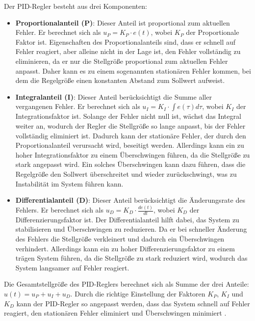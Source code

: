 Der PID-Regler besteht aus drei Komponenten: 
\begin{itemize}
    \item \textbf{Proportionalanteil (P)}: Dieser Anteil ist proportional zum aktuellen Fehler. Er berechnet sich als $ u_P = K_P \cdot e(t)$, wobei $K_P$ der Proportionale Faktor ist. Eigenschaften des Proportionalanteils sind, dass er schnell auf Fehler reagiert, aber alleine nicht in der Lage ist, den Fehler vollständig zu eliminieren, da er nur die Stellgröße proportional zum aktuellen Fehler anpasst. Daher kann es zu einem sogenannten stationären Fehler kommen, bei dem die Regelgröße einen konstanten Abstand zum Sollwert aufweist.
    
    \item \textbf{Integralanteil (I)}: Dieser Anteil berücksichtigt die Summe aller vergangenen Fehler. Er berechnet sich als $ u_I = K_I \cdot \int e(\tau) d\tau$, wobei $K_I$ der Integrationsfaktor ist. Solange der Fehler nicht null ist, wächst das Integral weiter an, wodurch der Regler die Stellgröße so lange anpasst, bis der Fehler vollständig eliminiert ist. Dadurch kann der stationäre Fehler, der durch den Proportionalanteil verursacht wird, beseitigt werden. Allerdings kann ein zu hoher Integrationsfaktor zu einem Überschwingen führen, da die Stellgröße zu stark angepasst wird. Ein solches Überschwingen kann dazu führen, dass die Regelgröße den Sollwert überschreitet und wieder zurückschwingt, was zu Instabilität im System führen kann.
    
    \item \textbf{Differentialanteil (D)}: Dieser Anteil berücksichtigt die Änderungsrate des Fehlers. Er berechnet sich als $ u_D = K_D \cdot \frac{de(t)}{dt}$, wobei $K_D$ der Differenzierungsfaktor ist. Der Differentialanteil hilft dabei, das System zu stabilisieren und Überschwingen zu reduzieren. Da er bei schneller Änderung des Fehlers die Stellgröße verkleinert und dadurch ein Überschwingen verhindert. Allerdings kann ein zu hoher Differenzierungsfaktor zu einem trägen System führen, da die Stellgröße zu stark reduziert wird, wodurch das System langsamer auf Fehler reagiert.
\end{itemize}

Die Gesamtstellgröße des PID-Reglers berechnet sich als Summe der drei Anteile: $ u(t) = u_P + u_I + u_D$. Durch die richtige Einstellung der Faktoren $K_P$, $K_I$ und $K_D$ kann der PID-Regler so angepasst werden, dass das System schnell auf Fehler reagiert, den stationären Fehler eliminiert und Überschwingen minimiert \cite[S. 832 ff.]{HandbuchElektrotechnik}.

